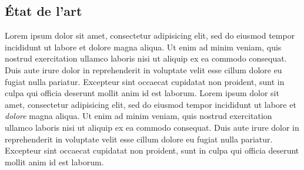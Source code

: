 \subsection{État de l'art}

Lorem ipsum dolor sit amet, consectetur adipisicing elit, sed do
eiusmod tempor incididunt ut labore et dolore magna aliqua. Ut enim ad
minim veniam, quis nostrud exercitation ullamco laboris nisi ut
aliquip ex ea commodo consequat. Duis aute irure dolor in
reprehenderit in voluptate velit esse cillum dolore eu fugiat nulla
pariatur. Excepteur sint occaecat cupidatat non proident, sunt in
culpa qui officia deserunt mollit anim id est laborum. Lorem ipsum
dolor sit amet, consectetur adipisicing elit, sed do eiusmod tempor
incididunt ut labore et \emph{dolore} magna aliqua. Ut enim ad minim
veniam, quis nostrud exercitation ullamco laboris nisi ut aliquip ex
ea commodo consequat. Duis aute irure dolor in reprehenderit in
voluptate velit esse cillum dolore eu fugiat nulla pariatur. Excepteur
sint occaecat cupidatat non proident, sunt in culpa qui officia
deserunt mollit anim id est laborum.


